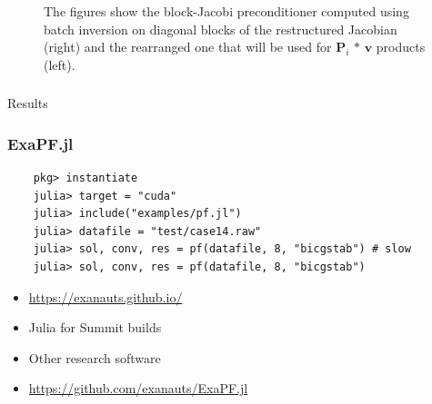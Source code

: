 \begin{frame}
\begin{figure}
{
  }
  \caption{The figures show the block-Jacobi preconditioner computed using batch inversion on diagonal blocks of the restructured Jacobian (right) and the rearranged one that will be used for $\bm{P}_i\,*\,\bm{v}$ products (left).}
  \label{fig:spyP}
\end{figure}
\end{frame}

\begin{frame}
  \frametitle{}
  \centering
  {\Huge Results}
\end{frame}

\begin{frame}[fragile]
  \frametitle{ExaPF.jl}
  \begin{lstlisting}
    pkg> instantiate
    julia> target = "cuda" 
    julia> include("examples/pf.jl") 
    julia> datafile = "test/case14.raw"
    julia> sol, conv, res = pf(datafile, 8, "bicgstab") # slow
    julia> sol, conv, res = pf(datafile, 8, "bicgstab")
  \end{lstlisting}
  \begin{itemize}
    \item \url{https://exanauts.github.io/}
    \item Julia for Summit builds
    \item Other research software
    \item \url{https://github.com/exanauts/ExaPF.jl}
  \end{itemize}
\end{frame}


